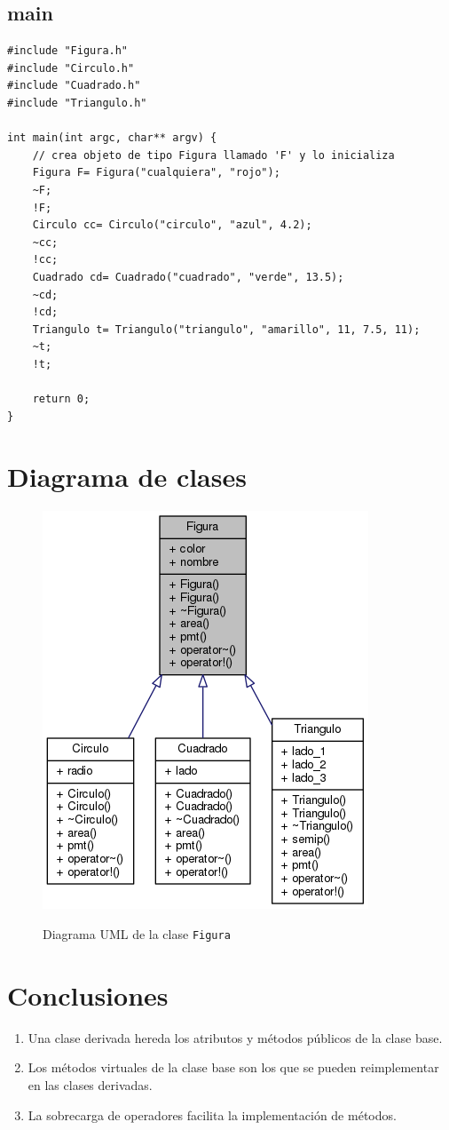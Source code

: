 \documentclass[11pt]{article}
\begin{document}
\subsection{main}
\begin{lstlisting}
#include "Figura.h"
#include "Circulo.h"
#include "Cuadrado.h"
#include "Triangulo.h"

int main(int argc, char** argv) {
	// crea objeto de tipo Figura llamado 'F' y lo inicializa
	Figura F= Figura("cualquiera", "rojo");
	~F;
	!F;
	Circulo cc= Circulo("circulo", "azul", 4.2);	
	~cc;
	!cc;
	Cuadrado cd= Cuadrado("cuadrado", "verde", 13.5);
	~cd;
	!cd;
	Triangulo t= Triangulo("triangulo", "amarillo", 11, 7.5, 11);
	~t;
	!t;
	
	return 0;
}
\end{lstlisting}

\section{Diagrama de clases}
\begin{figure}[H]
	\caption{Diagrama UML de la clase \texttt{Figura}}
	\centering
	\includegraphics[scale=0.9]{class_figura__inherit__graph.png}
	\label{fig:UML}
\end{figure}
\vspace{2 em}

\section{Conclusiones}
\begin{enumerate}
	\item Una clase derivada hereda los atributos y métodos públicos de la clase base.
	\item Los métodos virtuales de la clase base son los que se pueden reimplementar en las clases derivadas.
	\item La sobrecarga de operadores facilita la implementación de métodos.	
\end{enumerate}
\end{document}
